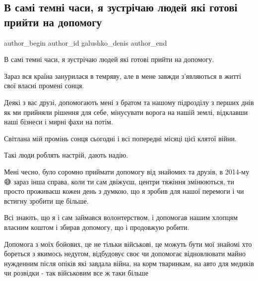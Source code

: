  
 
 
 
 

\subsection{В самі темні часи, я зустрічаю людей які готові прийти на допомогу}
\label{sec:20_11_2022.fb.galushko_denis.1.v_sam__temn__chasi__}

\ifcmt
 author_begin
   author_id galushko_denis
 author_end
\fi

В самі темні часи, я зустрічаю людей які готові прийти на допомогу.  

Зараз вся країна занурилася в темряву, але в мене завжди з’являються в житті
свої власні промені сонця.

Деякі з вас друзі, допомогають мені з братом та нашому підрозділу з перших днів
як ми прийняли рішення для себе, мінусувати ворога на нашій землі, відклавши
наші бізнеси і мирні фахи на потім.  

Світлана мій промінь сонця сьогодні і всі попередні місяці цієї клятої війни. 

Такі люди роблять настрій, дають надію. 

Мені чесно, було соромно приймати допомогу від знайомих та друзів, в 2014-му 😅
зараз інша справа, коли ти сам двіжуєш, центри тяжіння змінюються, ти просто
проживаєш кожен день з думкою, що я зробив для нашої перемоги і чи встигну
зробити ще більше. 

Всі знають, що я і сам займався волонтерством, і допомогав нашим хлопцям
власним коштом і збирав допомогу, що і  продовжую робити.

Допомога з моїх бойових, це не тільки військові, це можуть бути мої знайомі хто
бореться з якимось недугом, відбудовує своє чи допомогає відновлювати майно
нужденним після опіків які завдала війна, на корм тваринкам, на авто для
медиків чи розвідки - так військовим все ж таки більше💪🇺🇦 

